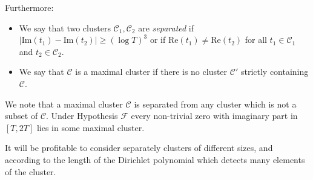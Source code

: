 \documentclass[12pt]{amsart}
\theoremstyle{plain}
\theoremstyle{definition}
\theoremstyle{remark}
\begin{document}
Furthermore:
\begin{itemize}
\item  We say that two clusters $\mathcal{C}_1,\mathcal{C}_2$ are \emph{separated} if $|\text{Im}(t_1)-\text{Im}(t_2)| \geq (\log T)^3$ or if $\text{Re}(t_1)\ne \text{Re}(t_2)$ for all $t_1 \in \mathcal{C}_1$ and $t_2 \in \mathcal{C}_2$.
\item We say that $\mathcal{C}$ is a maximal cluster if there is no cluster $\mathcal{C}'$ strictly containing $\mathcal{C}$.
\end{itemize}
We note that a maximal cluster $\mathcal{C}$ is separated from any cluster which is not a subset of $\mathcal{C}$. Under Hypothesis $\mathcal{F}$ every non-trivial zero with imaginary part in $[T,2T]$ lies in some maximal cluster.

It will be profitable to consider separately clusters of different sizes, and according to the length of the Dirichlet polynomial which detects many elements of the cluster. 
\end{document}
